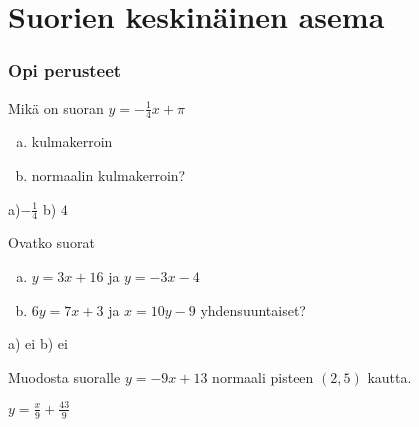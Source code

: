\section{Suorien keskinäinen asema}



\begin{tehtavasivu}

\subsubsection*{Opi perusteet}

\begin {tehtava}
Mikä on suoran $y=-\frac{1}{4}x+\pi$
\begin{enumerate} [a)]
\item kulmakerroin
\item normaalin kulmakerroin?
\end{enumerate}
\begin {vastaus}
a)$-\frac{1}{4}$  b) $4$ 
\end {vastaus}
\end {tehtava}

\begin {tehtava}
Ovatko suorat 
\begin{enumerate} [a)]
\item $y=3x+16$ ja $y=-3x-4$
\item $6y=7x+3$ ja $x=10y-9$ yhdensuuntaiset?
\end{enumerate}
\begin {vastaus}
a) ei b) ei
\end {vastaus}
\end {tehtava}

\begin {tehtava}
Muodosta suoralle $y=-9x+13$ normaali pisteen $(2,5)$ kautta.
\begin {vastaus}
$y=\frac{x}{9}+\frac{43}{9}$
\end {vastaus}
\end {tehtava}


\end{tehtavasivu}

